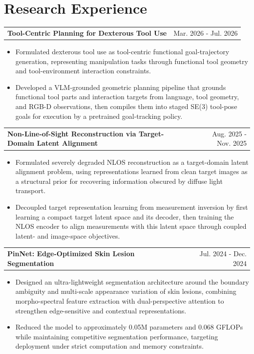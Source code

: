 \documentclass[10pt]{article}
\begin{document}
\section*{Research Experience}
\begin{tabularx}{\textwidth}{@{}Xr@{}}
\textbf{Tool-Centric Planning for Dexterous Tool Use} & Mar. 2026 - Jul. 2026
\end{tabularx}
\begin{itemize}
\item Formulated dexterous tool use as tool-centric functional goal-trajectory generation, representing manipulation tasks through functional tool geometry and tool-environment interaction constraints.
\item Developed a VLM-grounded geometric planning pipeline that grounds functional tool parts and interaction targets from language, tool geometry, and RGB-D observations, then compiles them into staged SE(3) tool-pose goals for execution by a pretrained goal-tracking policy.
\end{itemize}

\begin{tabularx}{\textwidth}{@{}Xr@{}}
\textbf{Non-Line-of-Sight Reconstruction via Target-Domain Latent Alignment} & Aug. 2025 - Nov. 2025
\end{tabularx}
\begin{itemize}
\item Formulated severely degraded NLOS reconstruction as a target-domain latent alignment problem, using representations learned from clean target images as a structural prior for recovering information obscured by diffuse light transport.
\item Decoupled target representation learning from measurement inversion by first learning a compact target latent space and its decoder, then training the NLOS encoder to align measurements with this latent space through coupled latent- and image-space objectives.
\end{itemize}

\begin{tabularx}{\textwidth}{@{}Xr@{}}
\textbf{PinNet: Edge-Optimized Skin Lesion Segmentation} & Jul. 2024 - Dec. 2024
\end{tabularx}
\begin{itemize}
\item Designed an ultra-lightweight segmentation architecture around the boundary ambiguity and multi-scale appearance variation of skin lesions, combining morpho-spectral feature extraction with dual-perspective attention to strengthen edge-sensitive and contextual representations.
\item Reduced the model to approximately 0.05M parameters and 0.068 GFLOPs while maintaining competitive segmentation performance, targeting deployment under strict computation and memory constraints.
\end{itemize}
\end{document}
